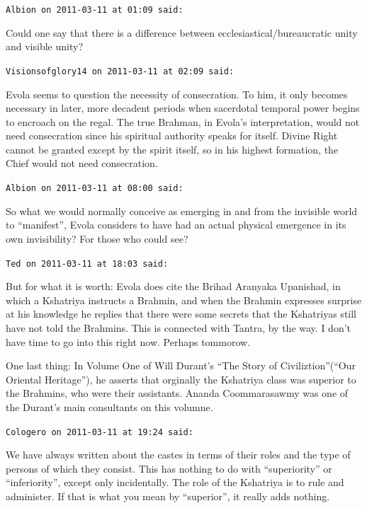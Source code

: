 \begin{footnotesize}
\begin{sffamily}
\texttt{Albion on 2011-03-11 at 01:09 said:}

Could one say that there is a difference between ecclesiastical/bureaucratic unity and visible unity?

\hfill

\texttt{Visionsofglory14 on 2011-03-11 at 02:09 said:}

Evola seems to question the necessity of consecration. To him, it only becomes necessary in later, more decadent periods when sacerdotal temporal power begins to encroach on the regal. The true Brahman, in Evola's interpretation, would not need consecration since his spiritual authority speaks for itself. Divine Right cannot be granted except by the spirit itself, so in his highest formation, the Chief would not need consecration.

\hfill

\texttt{Albion on 2011-03-11 at 08:00 said:}

So what we would normally conceive as emerging in and from the invisible world to ``manifest'', Evola considers to have had an actual physical emergence in its own invisibility? For those who could see?

\hfill

\texttt{Ted on 2011-03-11 at 18:03 said:}

But for what it is worth: Evola does cite the Brihad Aranyaka Upanishad, in which a Kshatriya instructs a Brahmin, and when the Brahmin expresses surprise at his knowledge he replies that there were some secrets that the Kshatriyas still have not told the Brahmins. This is connected with Tantra, by the way. I don't have time to go into this right now. Perhaps tommorow.

One last thing: In Volume One of Will Durant's ``The Story of Civiliztion''(``Our Oriental Heritage''), he asserts that orginally the Kshatriya class was superior to the Brahmins, who were their assistants. Ananda Coommarasawmy was one of the Durant's main consultants on this volumne.

\hfill

\texttt{Cologero on 2011-03-11 at 19:24 said:}

We have always written about the castes in terms of their roles and the type of persons of which they consist. This has nothing to do with ``superiority'' or ``inferiority'', except only incidentally. The role of the Kshatriya is to rule and administer. If that is what you mean by ``superior'', it really adds nothing.


\end{sffamily}
\end{footnotesize}
